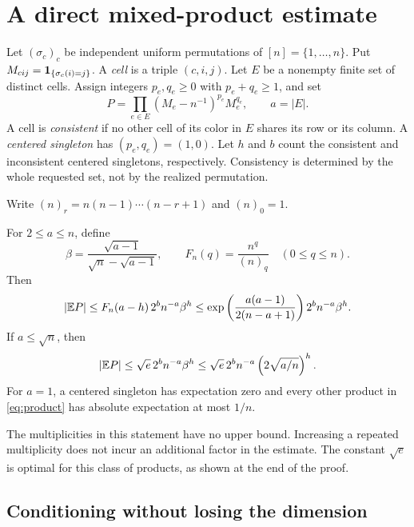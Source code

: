 \section{A direct mixed-product estimate}\label{sec:mixed}

Let $(\sigma_c)_c$ be independent uniform permutations of $[n]=\{1,\ldots,n\}$. Put $M_{cij}=\mathbf 1_{\{\sigma_c(i)=j\}}$. A \emph{cell} is a triple $(c,i,j)$. Let $E$ be a nonempty finite set of distinct cells. Assign integers $p_e,q_e\ge0$ with $p_e+q_e\ge1$, and set
\begin{equation}\label{eq:product}
P=\prod_{e\in E}(M_e-n^{-1})^{p_e}M_e^{q_e},\qquad a=|E|.
\end{equation}
A cell is \emph{consistent} if no other cell of its color in $E$ shares its row or its column. A \emph{centered singleton} has $(p_e,q_e)=(1,0)$. Let $h$ and $b$ count the consistent and inconsistent centered singletons, respectively. Consistency is determined by the whole requested set, not by the realized permutation.

Write $(n)_r=n(n-1)\cdots(n-r+1)$ and $(n)_0=1$.

\begin{theorem}\label{thm:mixed}
For $2\le a\le n$, define
\[
\beta=\frac{\sqrt{a-1}}{\sqrt n-\sqrt{a-1}},\qquad
F_n(q)=\frac{n^q}{(n)_q}\quad(0\le q\le n).
\]
Then
\begin{equation}\label{eq:mixedgeneral}
|\mathbb E P|\le F_n(a-h)\,2^b n^{-a}\beta^h
\le\exp\left(\frac{a(a-1)}{2(n-a+1)}\right)2^bn^{-a}\beta^h.
\end{equation}
If $a\le\sqrt n$, then
\begin{equation}\label{eq:mixedmain}
|\mathbb E P|\le\sqrt e\,2^b n^{-a}\beta^h
\le\sqrt e\,2^b n^{-a}\left(2\sqrt{a/n}\right)^h.
\end{equation}
For $a=1$, a centered singleton has expectation zero and every other product in \eqref{eq:product} has absolute expectation at most $1/n$.
\end{theorem}

The multiplicities in this statement have no upper bound. Increasing a repeated multiplicity does not incur an additional factor in the estimate. The constant $\sqrt e$ is optimal for this class of products, as shown at the end of the proof.

\subsection{Conditioning without losing the dimension}

